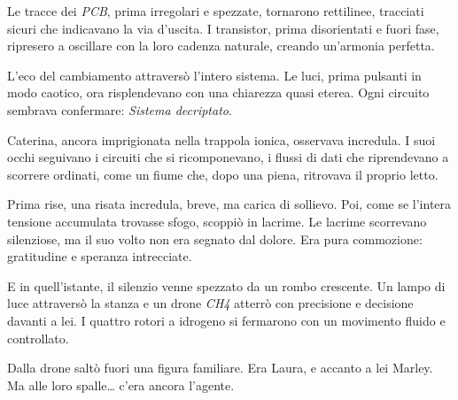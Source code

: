 Le tracce dei \textit{PCB}, prima irregolari e spezzate, tornarono rettilinee, tracciati sicuri che indicavano la via d’uscita. I transistor, prima disorientati e fuori fase, ripresero a oscillare con la loro cadenza naturale, creando un’armonia perfetta.

L’eco del cambiamento attraversò l’intero sistema. Le luci, prima pulsanti in modo caotico, ora risplendevano con una chiarezza quasi eterea. Ogni circuito sembrava confermare: \emph{Sistema decriptato}.

Caterina, ancora imprigionata nella trappola ionica, osservava incredula. I suoi occhi seguivano i circuiti che si ricomponevano, i flussi di dati che riprendevano a scorrere ordinati, come un fiume che, dopo una piena, ritrovava il proprio letto.

Prima rise, una risata incredula, breve, ma carica di sollievo. Poi, come se l’intera tensione accumulata trovasse sfogo, scoppiò in lacrime. Le lacrime scorrevano silenziose, ma il suo volto non era segnato dal dolore. Era pura commozione: gratitudine e speranza intrecciate.

E in quell’istante, il silenzio venne spezzato da un rombo crescente. Un lampo di luce attraversò la stanza e un drone \textit{CH4} atterrò con precisione e decisione davanti a lei. I quattro rotori a idrogeno si fermarono con un movimento fluido e controllato.

Dalla drone saltò fuori una figura familiare. Era Laura, e accanto a lei Marley. Ma alle loro spalle… c’era ancora l’agente.

